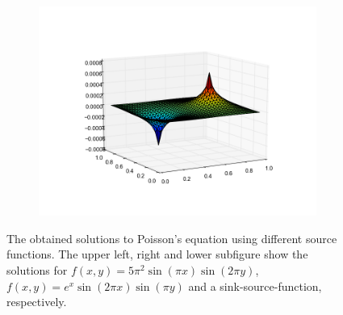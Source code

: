 \begin{figure}[h!]
\begin{subfigure}[b]{0.48\textwidth}
    \includegraphics[width=\textwidth, trim={2.5cm 2cm 2.5cm 2cm}, clip]{./Figures/surfplot_key4_5.png}
  \end{subfigure}
  \vspace{1\baselineskip}
  \caption{The obtained solutions to Poisson's equation using different source functions. The upper left, 
     right and lower subfigure show the solutions for
     $f(x,y) = 5 \pi^2 \sin (\pi \! x ) \sin (2 \! \pi \! y )$,
     $f(x,y) = e^x \sin ( 2 \! \pi \! x )\sin ( \pi \! y )$ and a 
     sink-source-function, respectively. 
     }
  \label{fig:time}
\end{figure}
%
